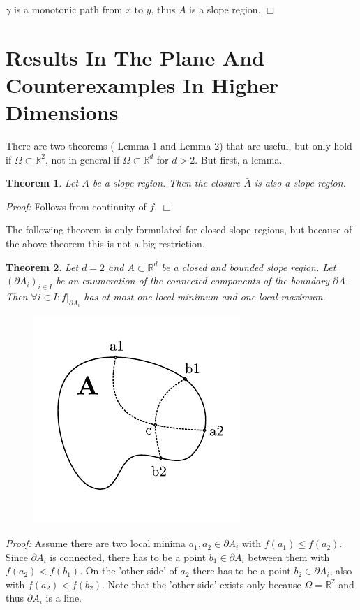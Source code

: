 \documentclass[11pt,twoside,twocolumn,a4paper]{article}
\theoremstyle{plain}
\newtheorem{thm}{Theorem}[section] %
\theoremstyle{definition}
\begin{document}
$\gamma$ is a monotonic path from $x$ to $y$, thus $A$ is a slope region.
\hfill $\Box$



\section{Results In The Plane And Counterexamples In Higher Dimensions}

There are two theorems (\!\!\cite{kropatsch2019computing} Lemma 1 and \cite{kropatsch2019computing} Lemma 2) that are useful, but only hold if $\Omega \subset \mathbb R^2$, not in general if $\Omega \subset \mathbb R^d$ for $d > 2$.
But first, a lemma.

\begin{thm}
Let $A$ be a slope region.
Then the closure $\bar A$ is also a slope region.
\end{thm}

\emph{Proof:} Follows from continuity of $f$.
\hfill $\Box$

The following theorem is only formulated for closed slope regions, but because of the above theorem this is not a big restriction.

\begin{thm}
Let $d = 2$ and $A \subset \mathbb R^d$ be a closed and bounded slope region.
Let $(\partial A_i)_{i\in I}$ be an enumeration of the connected components of the boundary $\partial A$.
Then $\forall i \in I : f|_{\partial A_i}$ has at most one local minimum and one local maximum.
\end{thm}

\begin{figure}
\centering
\includegraphics[width=0.5\columnwidth]{img/sketch_border_thm.pdf}
\label{fig:sketch_1}
\end{figure}

\emph{Proof:} Assume there are two local minima $a_1, a_2 \in \partial A_i$ with $f(a_1) \leq f(a_2)$.
Since $\partial A_i$ is connected, there has to be a point $b_1 \in \partial A_i$ between them with $f(a_2) < f(b_1)$.
On the 'other side' of $a_2$ there has to be a point $b_2 \in \partial A_i$, also with $f(a_2) < f(b_2)$.
Note that the 'other side' exists only because $\Omega = \mathbb R^2$ and thus $\partial A_i$ is a line.
\end{document}
